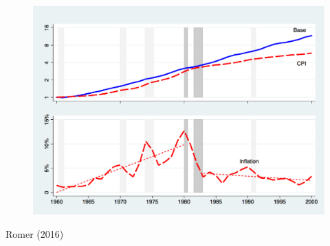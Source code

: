 \documentclass{beamer}
\begin{document}
\begin{frame}
  \begin{figure}
    \includegraphics[scale=.7]{romer.eps}
  \end{figure}
  Romer (2016)
\end{frame}
\end{document}

